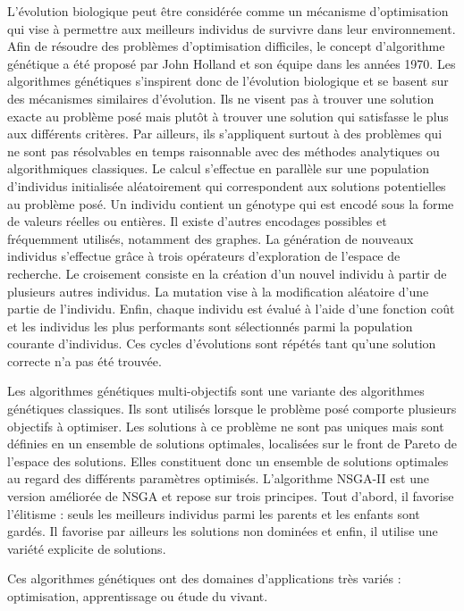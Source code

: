 \documentclass{llncs}
\begin{document}
L'évolution biologique peut être considérée comme un mécanisme d'optimisation qui vise à permettre aux meilleurs individus de survivre dans leur environnement.
Afin de résoudre des problèmes d'optimisation difficiles, le concept d'algorithme génétique a été proposé par John Holland et son équipe \cite{Holland:1975} dans les années 1970. 
Les algorithmes génétiques s'inspirent donc de l'évolution biologique et se basent sur des mécanismes similaires d'évolution.
Ils ne visent pas à trouver une solution exacte au problème posé mais plutôt à trouver une solution qui satisfasse le plus aux différents critères.
Par ailleurs, ils s'appliquent surtout à des problèmes qui ne sont pas résolvables en temps raisonnable avec des méthodes analytiques ou algorithmiques classiques.
Le calcul s'effectue en parallèle sur une population d’individus initialisée aléatoirement qui correspondent aux solutions potentielles au problème posé. 
Un individu contient un génotype qui est encodé sous la forme de valeurs réelles ou entières.
Il existe d'autres encodages possibles et fréquemment utilisés, notamment des graphes.
La génération de nouveaux individus s'effectue grâce à trois opérateurs d’exploration de l'espace de recherche. 
Le croisement consiste en la création d’un nouvel individu à partir de plusieurs autres individus. 
La mutation vise à la modification aléatoire d’une partie de l’individu. 
Enfin, chaque individu est évalué à l'aide d'une fonction coût et les individus les plus performants sont sélectionnés parmi la population courante d'individus.
Ces cycles d'évolutions sont répétés tant qu'une solution correcte n'a pas été trouvée.

Les algorithmes génétiques multi-objectifs sont une variante des algorithmes génétiques classiques.
Ils sont utilisés lorsque le problème posé comporte plusieurs objectifs à optimiser.
Les solutions à ce problème ne sont pas uniques mais sont définies en un ensemble de solutions optimales, localisées sur le front de Pareto de l'espace des solutions.
Elles constituent donc un ensemble de solutions optimales au regard des différents paramètres optimisés.
L'algorithme NSGA-II\cite{Deb:2002:FEM:2221359.2221582} est une version améliorée de NSGA et repose sur trois principes.
Tout d'abord, il favorise l'élitisme : seuls les meilleurs individus parmi les parents et les enfants sont gardés.
Il favorise par ailleurs les solutions non dominées et enfin, il utilise une variété explicite de solutions.

Ces algorithmes génétiques ont des domaines d'applications très variés : optimisation, apprentissage ou étude du vivant.
\end{document}
